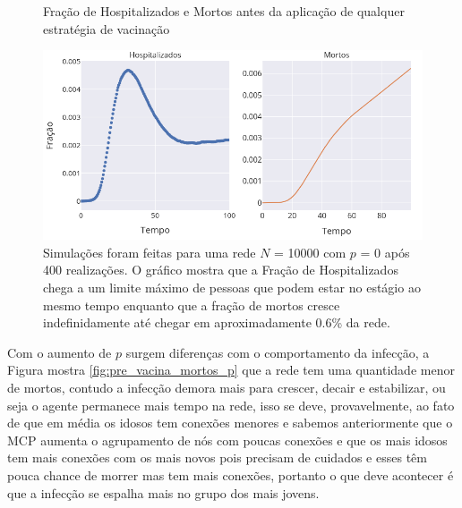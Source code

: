\begin{figure}[H]
    \centering
    \captionsetup{font=normalsize,skip=0.8pt,singlelinecheck=on,labelsep=endash}
    \caption{Fração de Hospitalizados e Mortos antes da aplicação de qualquer estratégia de vacinação}
    \includegraphics[scale= 0.5]{figuras/pre_vacina_mortos_nponderado.png}
    \captionsetup{font=small,justification=justified}
    \caption*{Simulações foram feitas para uma rede $N$ = 10000 com $p $ = 0 após 400 realizações. O gráfico mostra que a Fração de Hospitalizados chega a um limite máximo de pessoas que podem estar no estágio ao mesmo tempo enquanto que a fração de mortos cresce indefinidamente até chegar em aproximadamente 0.6\% da rede.}
    \label{fig:pre_vacina_mortos}
\end{figure}

Com o aumento de $p$ surgem diferenças com o comportamento da infecção, a Figura mostra \ref{fig:pre_vacina_mortos_p} que a rede tem uma quantidade menor de mortos, contudo a infecção demora mais para crescer, decair e estabilizar, ou seja o agente permanece mais tempo na rede, isso se deve, provavelmente, ao fato de que em média os idosos tem conexões menores e sabemos anteriormente que o MCP aumenta o agrupamento de nós com poucas conexões e que os mais idosos tem mais conexões com os mais novos pois precisam de cuidados e esses têm pouca chance de morrer mas tem mais conexões, portanto o que deve acontecer é que a infecção se espalha mais no grupo dos mais jovens.

